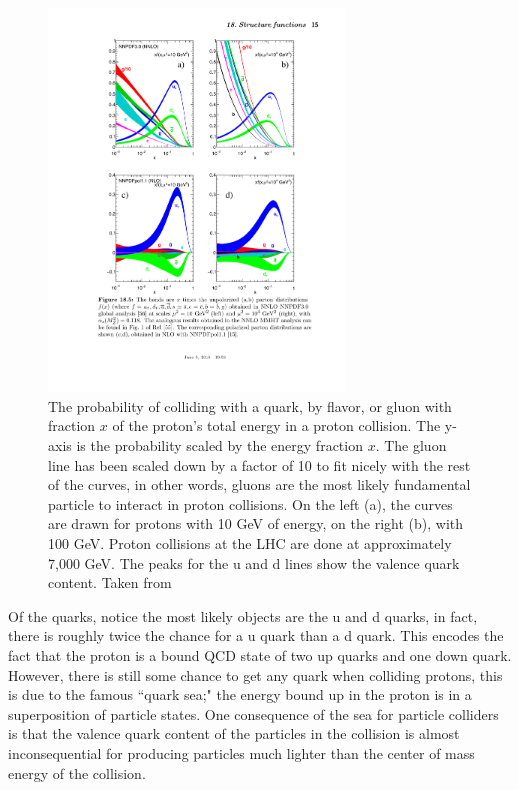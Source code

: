     \begin{figure}[h!]
      \centering
      \includegraphics[width=0.7\textwidth]{figures/proton_pdf.pdf}
      \caption[The probability of colliding with a quark, by flavor, or gluon with fraction $x$ of the proton's total energy in a proton collision. ]{The probability of colliding with a quark, by flavor, or gluon with fraction $x$ of the proton's total energy in a proton collision. The y-axis is the probability scaled by the energy fraction $x$. The gluon line has been scaled down by a factor of 10 to fit nicely with the rest of the curves, in other words, gluons are the most likely fundamental particle to interact in proton collisions. On the left (a), the curves are drawn for protons with 10 GeV of energy, on the right (b), with 100 GeV. Proton collisions at the LHC are done at approximately 7,000 GeV. The peaks for the u and d lines show the valence quark content. Taken from \cite[sec. ``Structure Functions"]{PDG}}
      \label{fig:proton_pdf}
    \end{figure}  

    Of the quarks, notice the most likely objects are the u and d quarks, in fact, there is roughly twice the chance for a u quark than a d quark. This encodes the fact that the proton is a bound QCD state of two up quarks and one down quark. However, there is still some chance to get any quark when colliding protons, this is due to the famous ``quark sea;" the energy bound up in the proton is in a superposition of particle states. One consequence of the sea for particle colliders is that the valence quark content of the particles in the collision is almost inconsequential for producing particles much lighter than the center of mass energy of the collision. 

